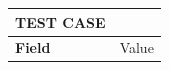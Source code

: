 \documentclass[11pt,a4paper]{article}
\begin{document}
\begin{tabular}{|p{3.2cm}|p{12.5cm}|}
\hline
\rowcolor{lightgray}
\textbf{TEST CASE} & \\
\hline
\textbf{Field} & Value \\
\hline
\end{tabular}
\end{document}
